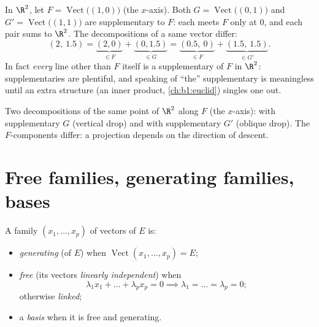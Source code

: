 \begin{example}
\label{ex:b1:vspaces:manysupplements}
In $\R^2$, let $F = \operatorname{Vect}\bigl((1,0)\bigr)$ (the
$x$-axis). Both $G = \operatorname{Vect}\bigl((0,1)\bigr)$ and
$G' = \operatorname{Vect}\bigl((1,1)\bigr)$ are supplementary to
$F$: each meets $F$ only at $0$, and each pair sums to $\R^2$.
The decompositions of a same vector differ:
\[
(2,\ 1.5) = \underbrace{(2, 0)}_{\in F} +
\underbrace{(0, 1.5)}_{\in G}
= \underbrace{(0.5,\ 0)}_{\in F} +
\underbrace{(1.5,\ 1.5)}_{\in G'} .
\]
In fact \emph{every} line other than $F$ itself is a
supplementary of $F$ in $\R^2$: supplementaries are plentiful,
and speaking of ``the'' supplementary is meaningless until an
extra structure (an inner product, \cref{ch:b1:euclid}) singles
one out.
\end{example}

\begin{omfigure}

{\small Two decompositions of the same point of $\R^2$ along $F$
(the $x$-axis): with supplementary $G$ (vertical drop) and with
supplementary $G'$ (oblique drop). The $F$-components differ:
a projection depends on the direction of descent.}
\end{omfigure}

\section{Free families, generating families, bases}

\begin{definition}\label{def:b1:vspaces:free}
A family $(x_1, \dots, x_p)$ of vectors of $E$ is:
\begin{itemize}
  \item \emph{generating} (of $E$) when
        $\operatorname{Vect}(x_1,\dots,x_p) = E$;
  \item \emph{free} (its vectors \emph{linearly
        independent}) when
        \[
        \lambda_1 x_1 + \dots + \lambda_p x_p = 0
        \implies \lambda_1 = \dots = \lambda_p = 0 ;
        \]
        otherwise \emph{linked};
  \item a \emph{basis} when it is free and generating.
\end{itemize}
\end{definition}

